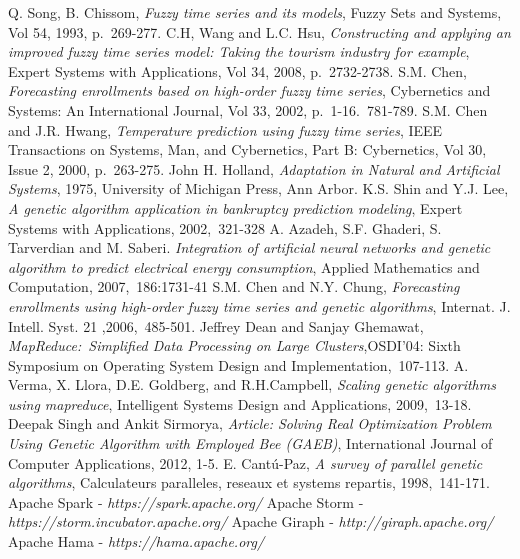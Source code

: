\documentclass[12pt,journal,compsoc]{IEEEtran}
\begin{document}
\begin{thebibliography}{1}
Q. Song, B. Chissom, \emph{Fuzzy time series and its models}, Fuzzy Sets and Systems, Vol 54, 1993, p.~269-277.
C.H, Wang and L.C. Hsu, \emph{Constructing and applying an improved fuzzy time series model: Taking the tourism industry for example}, Expert Systems with Applications, Vol 34, 2008, p.~2732-2738.
S.M. Chen, \emph{Forecasting enrollments based on high-order fuzzy time series}, Cybernetics and Systems: An International Journal, Vol 33, 2002, p.~1-16.~781-789.
S.M. Chen and J.R. Hwang, \emph{Temperature prediction using fuzzy time series}, IEEE Transactions on Systems, Man, and Cybernetics, Part B: Cybernetics, Vol 30, Issue 2, 2000, p.~263-275.
John H. Holland, \emph{Adaptation in Natural and Artificial Systems}, 1975, University of Michigan Press, Ann Arbor.
K.S. Shin and Y.J. Lee, \emph{A genetic algorithm application in bankruptcy prediction modeling}, Expert Systems with Applications, 2002,~321-328
A. Azadeh, S.F. Ghaderi, S. Tarverdian and M. Saberi. \emph{Integration of artificial neural networks and genetic algorithm to predict electrical energy consumption}, Applied Mathematics and Computation, 2007,~186:1731-41
S.M. Chen and N.Y. Chung, \emph{Forecasting enrollments using high-order fuzzy time series and genetic algorithms}, Internat. J. Intell. Syst. 21 ,2006,~485-501.
Jeffrey Dean and Sanjay Ghemawat, \emph{MapReduce:~Simplified Data Processing on Large Clusters},OSDI'04: Sixth Symposium on Operating System Design and 
Implementation,~107-113.
A. Verma, X. Llora, D.E. Goldberg, and R.H.Campbell, \emph{Scaling genetic algorithms using mapreduce}, Intelligent Systems Design and Applications, 2009,~13-18.
Deepak Singh and Ankit Sirmorya, \emph{Article: Solving Real Optimization Problem Using Genetic Algorithm with Employed Bee (GAEB)}, International Journal of Computer Applications, 2012, 1-5.
E. Cantú-Paz, \emph{A survey of parallel genetic algorithms}, Calculateurs paralleles, reseaux et systems repartis, 1998,~141-171.
Apache Spark - \emph{https://spark.apache.org/}
Apache Storm - \emph{https://storm.incubator.apache.org/}
Apache Giraph - \emph{http://giraph.apache.org/}
Apache Hama - \emph{https://hama.apache.org/}
\end{thebibliography}





\end{document}
